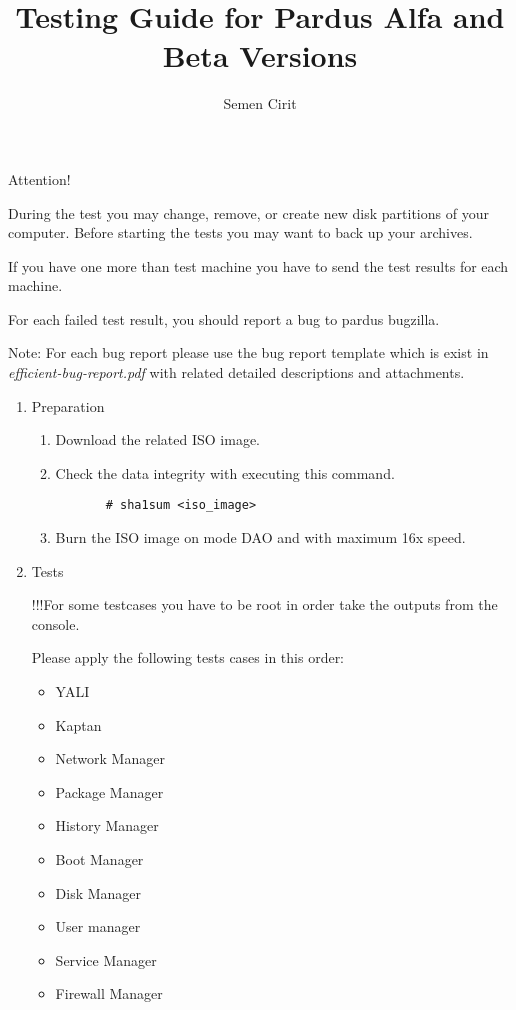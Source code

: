 \documentclass[a4paper,10pt]{article}
\title{Testing Guide for Pardus Alfa and Beta Versions}
\author{Semen Cirit}
\begin{document}
\maketitle

Attention!

    During the test you may change, remove, or create new disk partitions of your computer. 
    Before starting the tests you may want to back up your archives.
    
    
    If you have one more than test machine you have to send the test results for each machine.

    For each failed test result, you should report a bug to pardus bugzilla.

    Note: For each bug report please use the bug report template which is exist in \emph{efficient-bug-report.pdf} with related detailed descriptions and attachments. 

\begin{enumerate}
\item Preparation
  \begin{enumerate}
    \item Download the related ISO image.
    \item Check the data integrity with executing this command.
      \begin{verbatim}
       # sha1sum <iso_image>
      \end{verbatim}
    \item Burn the ISO image on mode DAO and with maximum 16x speed.
  \end{enumerate}
  \item Tests
    
 	!!!For some testcases you have to be root in order take the outputs from the console.
	
    Please apply the following tests cases in this order:
    \begin{itemize}
    \item YALI
    \item Kaptan
    \item Network Manager
    \item Package Manager
    \item History Manager
    \item Boot Manager
    \item Disk Manager
    \item User manager
    \item Service Manager
    \item Firewall Manager
    \end{itemize}
 \end{enumerate}
\end{document}
